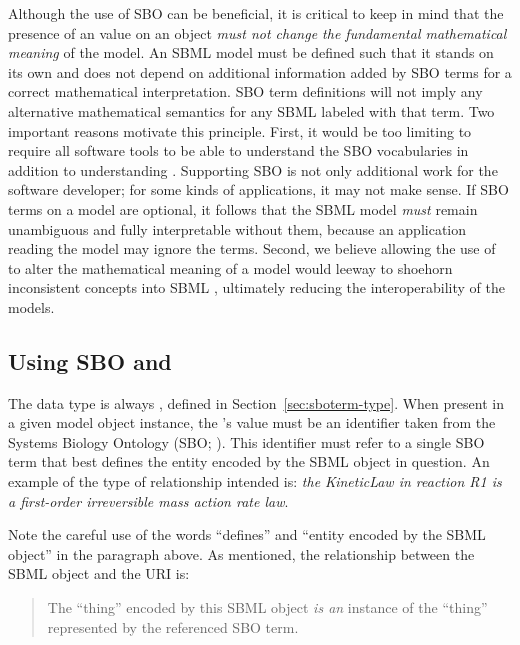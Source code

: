 Although the use of SBO can be beneficial, it is critical to keep
in mind that the presence of an  value on an object
\emph{must not change the fundamental mathematical meaning} of the
model.  An SBML model must be defined such that it stands on its
own and does not depend on additional information added by SBO
terms for a correct mathematical interpretation.  SBO term
definitions will not imply any alternative mathematical semantics
for any SBML  labeled with that term.  Two important
reasons motivate this principle.  First, it would be too limiting
to require all software tools to be able to understand the SBO
vocabularies in addition to understanding \changed{\sbmltwothree}.
Supporting SBO is not only additional work for the software
developer; for some kinds of applications, it may not make sense.
If SBO terms on a model are optional, it follows that the SBML
model \emph{must} remain unambiguous and fully interpretable
without them, because an application reading the model may ignore
the terms.  Second, we believe allowing the use of 
to alter the mathematical meaning of a model would  leeway to shoehorn inconsistent concepts into SBML
, ultimately reducing the interoperability of the
models.

\subsection{Using SBO and }

The   data type is always
, defined in Section~\ref{sec:sboterm-type}.
When present in a given model object instance, the
's value must be an identifier taken from the
Systems Biology Ontology (SBO; \sboref).  This identifier must
refer to a single SBO term that best defines the entity encoded by
the SBML object in question.  An example of the type of
relationship intended is: \emph{the KineticLaw in reaction R1 is a
  first-order irreversible mass action rate law}.

Note the careful use of the words ``defines'' and ``entity encoded
by the SBML object'' in the paragraph above.  As mentioned, the
relationship between the SBML object and the URI is:

\begin{quote}
  The ``thing'' encoded by this SBML object \emph{is an} instance
  of the ``thing'' represented by the referenced SBO term.
\end{quote}


